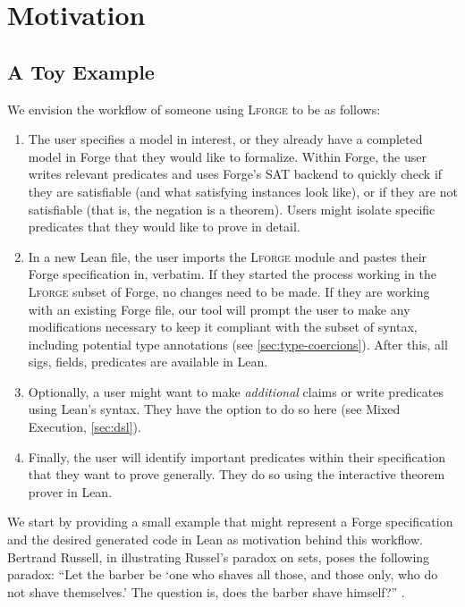 \section{Motivation}


\subsection{A Toy Example}\label{sec:toy-example}

We envision the workflow of someone using \textsc{Lforge} to be as follows: 
\begin{enumerate}
    \item The user specifies a model in interest, or they already have a completed model in Forge that they would like to formalize. Within Forge, the user writes relevant predicates and uses Forge's SAT backend to quickly check if they are satisfiable (and what satisfying instances look like), or if they are not satisfiable (that is, the negation is a theorem). Users might isolate specific predicates that they would like to prove in detail. 
    \item In a new Lean file, the user imports the \textsc{Lforge} module and pastes their Forge specification in, verbatim. If they started the process working in the \textsc{Lforge} subset of Forge, no changes need to be made. If they are working with an existing Forge file, our tool will prompt the user to make any modifications necessary to keep it compliant with the subset of syntax, including potential type annotations (see \cref{sec:type-coercions}). After this, all sigs, fields, predicates are available in Lean. 
    \item Optionally, a user might want to make \emph{additional} claims or write predicates using Lean's syntax. They have the option to do so here (see Mixed Execution, \cref{sec:dsl}). 
    \item Finally, the user will identify important predicates within their specification that they want to prove generally. They do so using the interactive theorem prover in Lean. 
\end{enumerate}

We start by providing a small example that might represent a Forge specification and the desired generated code in Lean as motivation behind this workflow. Bertrand Russell, in illustrating Russel's paradox on sets, poses the following paradox: ``Let the barber be `one who shaves all those, and those only, who do not shave themselves.' The question is, does the barber shave himself?'' \cite[101]{russell2009philosophy}. 

